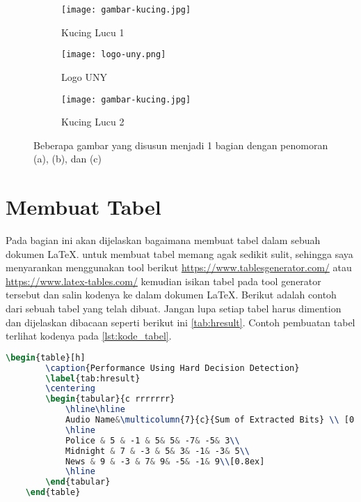 \begin{figure}
    \centering
    \begin{subfigure}[b]{0.3\textwidth}
        \centering
        \texttt{[image: gambar-kucing.jpg]}
        \caption{Kucing Lucu 1}
        \label{fig:kucing-a}
    \end{subfigure}
    \hfill
    \begin{subfigure}[b]{0.3\textwidth}
        \centering
        \texttt{[image: logo-uny.png]}
        \caption{Logo UNY}
        \label{fig:logo-uny-b}
    \end{subfigure}
    \hfill
    \begin{subfigure}[b]{0.3\textwidth}
        \centering
        \texttt{[image: gambar-kucing.jpg]}
        \caption{Kucing Lucu 2}
        \label{fig:kucing-c}
    \end{subfigure}
    \caption{Beberapa gambar yang disusun menjadi 1 bagian dengan penomoran (a), (b), dan (c)}
    \label{fig:kucingdanUNY}
\end{figure}

\section{Membuat Tabel}
Pada bagian ini akan dijelaskan bagaimana membuat tabel dalam sebuah dokumen \LaTeX. untuk membuat tabel memang agak sedikit sulit, sehingga saya menyarankan menggunakan tool berikut \url{https://www.tablesgenerator.com/} atau \url{https://www.latex-tables.com/} kemudian isikan tabel pada tool generator tersebut dan salin kodenya ke dalam dokumen \LaTeX. Berikut adalah contoh dari sebuah tabel yang telah dibuat. Jangan lupa setiap tabel harus dimention dan dijelaskan dibacaan seperti berikut ini \cref{tab:hresult}. Contoh pembuatan tabel terlihat kodenya pada \cref{lst:kode_tabel}.

\begin{lstlisting}[language=TeX, caption=Kode untuk Membuat Tabel dalam Dokumen, label=lst:kode_tabel]
    \begin{table}[h]
        \caption{Performance Using Hard Decision Detection}
        \label{tab:hresult}
        \centering
        \begin{tabular}{c rrrrrrr}
            \hline\hline
            Audio Name&\multicolumn{7}{c}{Sum of Extracted Bits} \\ [0.5ex] 
            \hline
            Police & 5 & -1 & 5& 5& -7& -5& 3\\
            Midnight & 7 & -3 & 5& 3& -1& -3& 5\\
            News & 9 & -3 & 7& 9& -5& -1& 9\\[0.8ex]
            \hline
        \end{tabular}
    \end{table}
\end{lstlisting}

